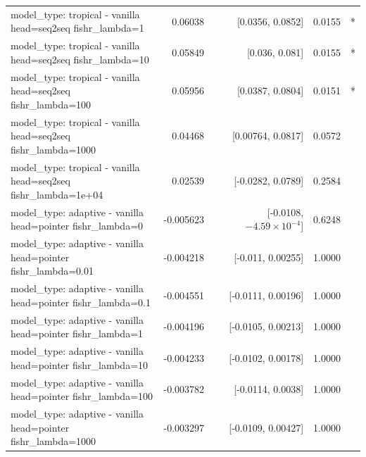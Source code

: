 \documentclass[10pt]{article}
\makeatletter
\newcommand{\stackcell}[1]{\begin{tabular}[t]{@{}l@{}}#1\end{tabular}}
\makeatother
\begin{document}
{\begin{longtable}{lrrrl}
\stackcell{model\_type: tropical - vanilla\\\footnotesize head=seq2seq fishr\_lambda=1 } & 0.06038 & [0.0356, 0.0852] & 0.0155 & *\\
\stackcell{model\_type: tropical - vanilla\\\footnotesize head=seq2seq fishr\_lambda=10 } & 0.05849 & [0.036, 0.081] & 0.0155 & *\\
\stackcell{model\_type: tropical - vanilla\\\footnotesize head=seq2seq fishr\_lambda=100 } & 0.05956 & [0.0387, 0.0804] & 0.0151 & *\\
\stackcell{model\_type: tropical - vanilla\\\footnotesize head=seq2seq fishr\_lambda=1000 } & 0.04468 & [0.00764, 0.0817] & 0.0572 & \\
\stackcell{model\_type: tropical - vanilla\\\footnotesize head=seq2seq fishr\_lambda=1e+04 } & 0.02539 & [-0.0282, 0.0789] & 0.2584 & \\
\stackcell{model\_type: adaptive - vanilla\\\footnotesize head=pointer fishr\_lambda=0 } & -0.005623 & [-0.0108, $-4.59\times10^{-4}$] & 0.6248 & \\
\stackcell{model\_type: adaptive - vanilla\\\footnotesize head=pointer fishr\_lambda=0.01 } & -0.004218 & [-0.011, 0.00255] & 1.0000 & \\
\stackcell{model\_type: adaptive - vanilla\\\footnotesize head=pointer fishr\_lambda=0.1 } & -0.004551 & [-0.0111, 0.00196] & 1.0000 & \\
\stackcell{model\_type: adaptive - vanilla\\\footnotesize head=pointer fishr\_lambda=1 } & -0.004196 & [-0.0105, 0.00213] & 1.0000 & \\
\stackcell{model\_type: adaptive - vanilla\\\footnotesize head=pointer fishr\_lambda=10 } & -0.004233 & [-0.0102, 0.00178] & 1.0000 & \\
\stackcell{model\_type: adaptive - vanilla\\\footnotesize head=pointer fishr\_lambda=100 } & -0.003782 & [-0.0114, 0.0038] & 1.0000 & \\
\stackcell{model\_type: adaptive - vanilla\\\footnotesize head=pointer fishr\_lambda=1000 } & -0.003297 & [-0.0109, 0.00427] & 1.0000 & \\

\end{longtable}}
\end{document}
